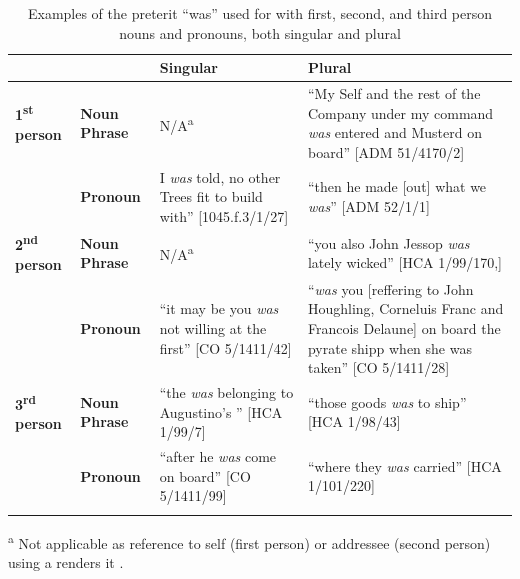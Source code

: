 \begin{table}
\caption{\label{tab:key:6.1} Examples of the preterit “was” used for with first, second, and third person nouns and pronouns, both singular and plural}
\begin{tabularx}{\textwidth}{llQQ} 
\lsptoprule
&  & \textbf{Singular} & \textbf{Plural}\\
\midrule
 \textbf{1\textsuperscript{st}} \textbf{person} & \textbf{Noun} \textbf{Phrase} & N/A\textsuperscript{a} & “My Self and the rest of the Company under my command \textit{was} entered and Musterd on board” [ADM 51/4170/2]\\
& \textbf{Pronoun} & I \textit{was} told, no other Trees fit to build with” [1045.f.3/1/27] & “then he made [out] what we \textit{was}” [ADM 52/1/1]\\

\tablevspace
 \textbf{2\textsuperscript{nd}} \textbf{person} & \textbf{Noun} \textbf{Phrase} & N/A\textsuperscript{a} & “you also John Jessop \textit{was} lately wicked” [HCA 1/99/170,]\\
& \textbf{Pronoun} & “it may be you \textit{was} not willing at the first” [CO 5/1411/42] & “\textit{was} you [reffering to John Houghling, Corneluis Franc and Francois Delaune] on board the pyrate shipp when she was taken” [CO 5/1411/28] \\

\tablevspace
 \textbf{3\textsuperscript{rd}} \textbf{person} & \textbf{Noun} \textbf{Phrase} & “the  \textit{was} belonging to Augustino’s ” [HCA 1/99/7] & “those goods \textit{was} to ship” [HCA 1/98/43] \\
& \textbf{Pronoun} & “after he \textit{was} come on board” [CO 5/1411/99] & “where they \textit{was} carried” [HCA 1/101/220]\\

\lspbottomrule
\end{tabularx}
\textsuperscript{a} Not applicable as reference to self (first person) or addressee (second person) using a  renders it . 
\end{table}

